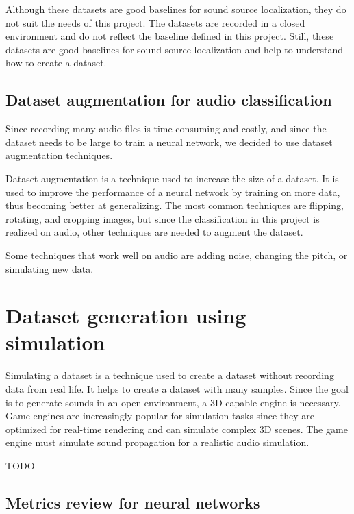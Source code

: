 Although these datasets are good baselines for sound source localization, they do not suit the needs of this project. The datasets are recorded in a closed environment and do not reflect the baseline defined in this project. Still, these datasets are good baselines for sound source localization and help to understand how to create a dataset.

\subsection{Dataset augmentation for audio classification}
Since recording many audio files is time-consuming and costly, and since the dataset needs to be large to train a neural network, we decided to use dataset augmentation techniques.

Dataset augmentation is a technique used to increase the size of a dataset. It is used to improve the performance of a neural network by training on more data, thus becoming better at generalizing. The most common techniques are flipping, rotating, and cropping images, but since the classification in this project is realized on audio, other techniques are needed to augment the dataset. 

Some techniques that work well on audio are adding noise, changing the pitch, or simulating new data. 

\section{Dataset generation using simulation}
\label{sec:dataset_generation_simulation}

Simulating a dataset is a technique used to create a dataset without recording data from real life. It helps to create a dataset with many samples. Since the goal is to generate sounds in an open environment, a 3D-capable engine is necessary. Game engines are increasingly popular for simulation tasks since they are optimized for real-time rendering and can simulate complex 3D scenes. The game engine must simulate sound propagation for a realistic audio simulation. 

TODO






\subsection{Metrics review for neural networks}

